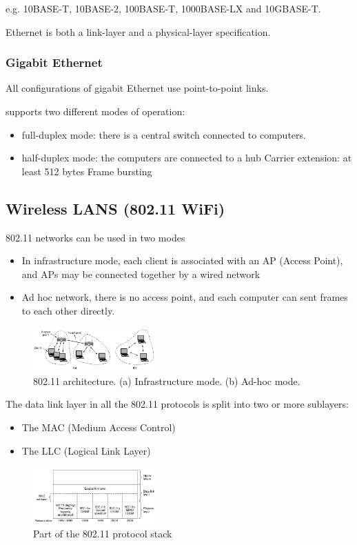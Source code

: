 e.g. 10BASE-T, 10BASE-2, 100BASE-T, 1000BASE-LX and 10GBASE-T. 

Ethernet is both a link-layer and a physical-layer specification. 

\subsubsection{Gigabit Ethernet}
All configurations of gigabit Ethernet use point-to-point links. 

supports two different modes of operation: 
\begin{itemize}
    \item full-duplex mode: there is a central switch connected to computers. 
    \item half-duplex mode: the computers are connected to a hub
    \subitem Carrier extension: at least 512 bytes
    \subitem Frame bursting
\end{itemize}

\subsection{Wireless LANS (802.11 WiFi)}
802.11 networks can be used in two modes
\begin{itemize}
    \item In infrastructure mode, each client is associated with an AP (Access Point), and APs may be connected together by a wired network
    \item Ad hoc network, there is no access point, and each computer can sent frames to each other directly.
\end{itemize}
\begin{figure}[!htb]
    \centering
    \includegraphics[width=0.42\textwidth]{pic/CN4/802.11 architecture}
    \caption{802.11 architecture. (a) Infrastructure mode. (b) Ad-hoc mode.}
\end{figure}

The data link layer in all the 802.11 protocols is split into two or more sublayers:
\begin{itemize}
    \item The MAC (Medium Access Control)
    \item The LLC (Logical Link Layer)
\end{itemize}
\begin{figure}[!htb]
    \centering
    \includegraphics[width=0.42\textwidth]{pic/CN4/Part of the 802.11 protocol stack}
    \caption{Part of the 802.11 protocol stack}
\end{figure}

